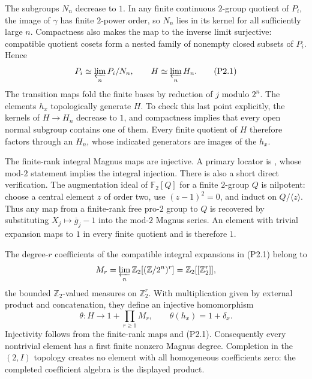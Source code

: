 \documentclass[11pt,a4paper]{article}
\theoremstyle{definition}
\begin{document}
The subgroups $N_n$ decrease to $1$. In any finite continuous $2$-group quotient of $P_i$, the image of $\gamma$ has finite $2$-power order, so $N_n$ lies in its kernel for all sufficiently large $n$. Compactness also makes the map to the inverse limit surjective: compatible quotient cosets form a nested family of nonempty closed subsets of $P_i$. Hence
\[
 P_i\simeq\varprojlim_nP_i/N_n,
 \qquad
 H\simeq\varprojlim_nH_n.                                  \tag{P2.1}
\]
The transition maps fold the finite bases by reduction of $j$ modulo $2^n$. The elements $h_x$ topologically generate $H$. To check this last point explicitly, the kernels of $H\to H_n$ decrease to $1$, and compactness implies that every open normal subgroup contains one of them. Every finite quotient of $H$ therefore factors through an $H_n$, whose indicated generators are images of the $h_x$.

The finite-rank integral Magnus maps are injective. A primary locator is \cite[\S5.1, p.~21, (5.1)]{MinacPasiniQuadrelliTan2020}, whose mod-$2$ statement implies the integral injection. There is also a short direct verification. The augmentation ideal of $\mathbb F_2[Q]$ for a finite $2$-group $Q$ is nilpotent: choose a central element $z$ of order two, use $(z-1)^2=0$, and induct on $Q/\langle z\rangle$. Thus any map from a finite-rank free pro-$2$ group to $Q$ is recovered by substituting $X_j\mapsto\overline g_j-1$ into the mod-$2$ Magnus series. An element with trivial expansion maps to $1$ in every finite quotient and is therefore $1$.

The degree-$r$ coefficients of the compatible integral expansions in (P2.1) belong to
\[
 M_r=\varprojlim_n\mathbb Z_2[(\mathbb Z/2^n)^r]
     =\mathbb Z_2[[\mathbb Z_2^r]],
\]
the bounded $\mathbb Z_2$-valued measures on $\mathbb Z_2^r$. With multiplication given by external product and concatenation, they define an injective homomorphism
\[
 \theta:H\longrightarrow1+\prod_{r\geq1}M_r,
 \qquad \theta(h_x)=1+\delta_x.                             \tag{P2.2}
\]
Injectivity follows from the finite-rank maps and (P2.1). Consequently every nontrivial element has a first finite nonzero Magnus degree. Completion in the $(2,I)$ topology creates no element with all homogeneous coefficients zero: the completed coefficient algebra is the displayed product.
\end{document}
